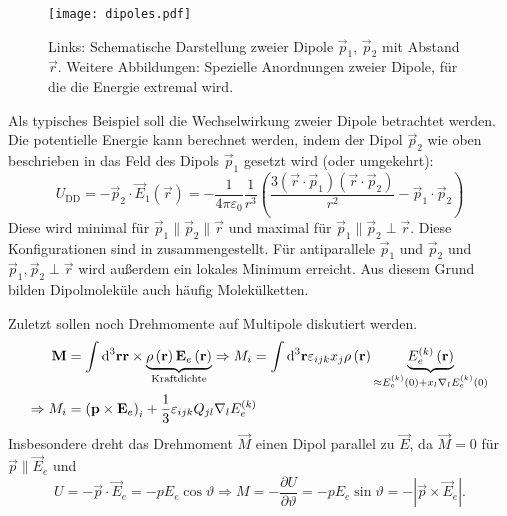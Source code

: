 \begin{figure}[htb]
	\centering
	\texttt{[image: dipoles.pdf]}
	\caption{Links: Schematische Darstellung zweier Dipole $\vec p_1$, $\vec p_2$ mit Abstand $\vec r$. Weitere Abbildungen: Spezielle Anordnungen zweier Dipole, für die die Energie extremal wird. }
	\label{fig:dipoles}
\end{figure}

Als typisches Beispiel soll die Wechselwirkung zweier Dipole betrachtet werden. Die potentielle Energie kann berechnet werden, indem der Dipol $\vec {p}_{2}$ wie oben beschrieben in das Feld des Dipols $\vec {p}_{1}$ gesetzt wird (oder umgekehrt):
\begin{equation*}
	U_{\mathrm{DD}}=-\vec {p}_{2}\cdot \vec {E}_{1}\left(\vec {r}\right)=-\frac{1}{4\pi \varepsilon _{0}}\frac{1}{r^{3}}\left(\frac{3\left(\vec {r}\cdot \vec {p}_{1}\right)\left(\vec {r}\cdot \vec {p}_{2}\right)}{r^{2}}-\vec {p}_{1}\cdot \vec {p}_{2}\right)
\end{equation*}
Diese wird minimal für $\vec {p}_{1}\parallel \vec {p}_{2}\parallel \vec {r}$ und maximal für $\vec {p}_{1}\parallel \vec {p}_{2}\perp \vec {r}$. Diese Konfigurationen sind in  zusammengestellt. Für antiparallele $\vec {p}_{1}$ und $\vec {p}_{2}$ und $\vec {p}_{1},\vec {p}_{2}\perp \vec {r}$ wird außerdem ein lokales Minimum erreicht. Aus diesem Grund bilden Dipolmoleküle auch häufig Molekülketten.

Zuletzt sollen noch Drehmomente auf Multipole diskutiert werden.
\begin{align*}
		\mathbf{M}          & =\int \text{d} ^{3}\mathbf{r}\mathbf{r}\times \underset{\text{Kraftdichte}}{\underbrace{\rho \left(\mathbf{r}\right)\mathbf{E}_{e}\left(\mathbf{r}\right)}}\Rightarrow M_{i}=\int \text{d} ^{3}\mathbf{r}\varepsilon _{ijk}x_{j}\rho \left(\mathbf{r}\right)\underset{\approx E_{e}^{\left(k\right)}\left(0\right)+x_{l}\nabla _{l}E_{e}^{\left(k\right)}\left(0\right)}{\underbrace{E_{e}^{\left(k\right)}\left(\mathbf{r}\right)}} \\
		\Rightarrow M_{i} & =\left(\mathbf{p}\times \mathbf{E}_{e}\right)_{i}+\frac{1}{3}\varepsilon _{ijk}Q_{jl}\nabla _{l}E_{e}^{\left(k\right)}
\end{align*}
Insbesondere dreht das Drehmoment $\vec {M}$ einen Dipol parallel zu $\vec {E}$, da $\vec {M}=0$ für $\vec {p}\parallel \vec {E}_{e}$ und
\begin{equation*}
	U=-\vec {p}\cdot \vec {E}_{e}=-pE_{e}\cos \vartheta \Rightarrow M=-\frac{\partial U}{\partial \vartheta }=-pE_{e}\sin \vartheta =-\left| \vec {p}\times \vec {E}_{e}\right| .
\end{equation*}